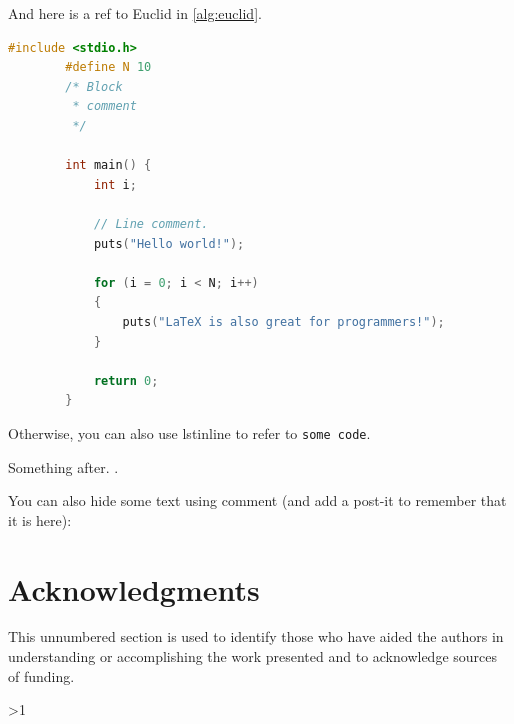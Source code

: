 \documentclass[a4paper]{article}  %
\newcommand{\Pathbasebib}{\PathR/ref_RN.bib,\PathR/ref_XX.bib}%
\begin{document}
    And here is a ref to Euclid in \cref{alg:euclid}.
	
	\FloatBarrier
	
    \begin{lstlisting}[language=C++, frame=single, caption=An extract of \lstinline$C++$ code using 'listing'., gobble=8]
        #include <stdio.h>
        #define N 10
        /* Block
         * comment 
         */
        
        int main() {
            int i;
        
            // Line comment.
            puts("Hello world!");
            
            for (i = 0; i < N; i++)
            {
                puts("LaTeX is also great for programmers!");
            }
        
            return 0;
        }
    \end{lstlisting}

    

    Otherwise, you can also use lstinline to refer to \lstinline{some code}.
    
    Something after.
    .

    You can also hide some text using comment (and add a post-it to remember that it is here):

\section*{Acknowledgments}       
 
    This unnumbered section is used to identify those who have aided the authors in understanding or accomplishing the work presented and to acknowledge sources of funding.  
    
    
\ifnum\value{levelstanda}>1
	{}%
\else
    
	\printunsrtglossary[type=acronym]
	\printunsrtglossary[type=symbol]
\fi

\addtocounter{levelstanda}{-1}
\end{document}
